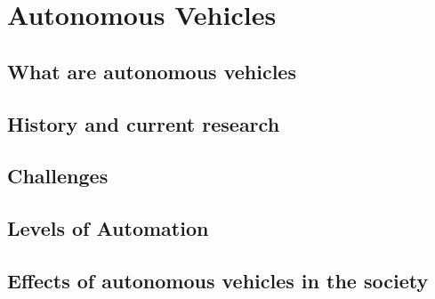 \section{Autonomous Vehicles} \label{autonomous-vehicles}
\subsection{What are autonomous vehicles}
\subsection{History and current research}
\subsection{Challenges}
\subsection{Levels	of	Automation}
\subsection{Effects of autonomous vehicles in the society}